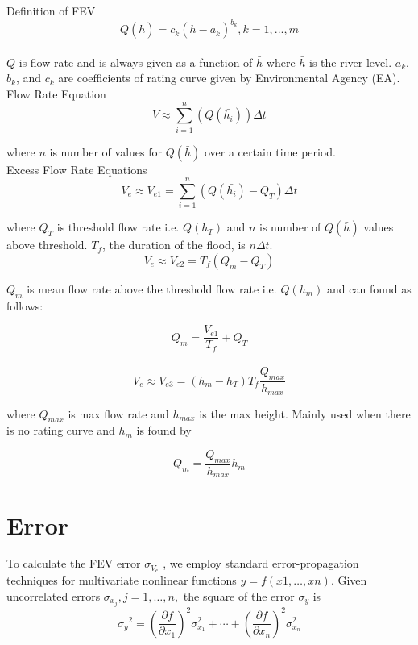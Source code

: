 Definition of FEV \\

$$Q(\bar{h})=c_k(\bar{h}-a_k)^{b_k}, k = 1,...,m$$ \\

$Q$ is flow rate and is always given as a function of $\bar{h}$ where $\bar{h}$ is the river level. $a_k$, $b_k$, and $c_k$ are coefficients of rating curve given by Environmental Agency (EA). \\

Flow Rate Equation\\

$$V \approx \sum_{i=1}^{n}(Q(\bar{h_i}))\Delta t$$

where $n$ is number of values for $Q(\bar{h})$ over a certain time period. \\

Excess Flow Rate Equations \\

$$V_e \approx V_{e1} = \sum_{i=1}^{n}(Q(\bar{h_i})-Q_T)\Delta t$$

where $Q_T$ is threshold flow rate i.e. $Q(h_T)$ and $n$ is number of $Q(\bar{h})$ values above threshold. $T_f$, the duration of the flood, is $n \Delta t$.\\

$$V_e \approx V_{e2} = T_f(Q_m-Q_T)$$

$Q_m$ is mean flow rate above the threshold flow rate i.e. $Q(h_m)$ and can found as follows:

$$Q_m = \frac{V_{e1}}{T_f}+Q_T$$ \\

$$V_e \approx V_{e3} = (h_m - h_T)T_f\frac{Q_{max}}{h_{max}}$$

where $Q_{max}$ is max flow rate and $h_{max}$ is the max height. Mainly used when there is no rating curve and $h_m$ is found by

$$Q_m = \frac{Q_{max}}{h_{max}}h_m$$

\section*{Error}
To calculate the FEV error $\sigma_{V_e}$ , we employ standard error-propagation techniques for multivariate nonlinear functions $y = f (x1, \ldots, xn)$. Given uncorrelated errors $\sigma_{x_j} , j = 1, \ldots, n,$ the square of the error $\sigma_y$ is
\[{\sigma _{y}}^2=\left ( {\frac{\partial f}{\partial x_{1}}} \right )^2\sigma _{x_{1}}^2+\cdots+\left ( {\frac{\partial f}{\partial x_{n}}} \right )^2\sigma _{x_{n}}^2\]


